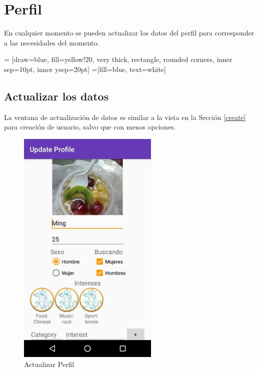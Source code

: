 \documentclass[10pt,letterpaper,extrafontsizes]{memoir}
\begin{document}
\chapter{Perfil}\label{cap:perf}

En cualquier momento se pueden actualizar los datos del perfil para corresponder a las necesidades del momento.

\begin{center}
 = [draw=blue, fill=yellow!20, very thick,
    rectangle, rounded corners, inner sep=10pt, inner ysep=20pt]
 =[fill=blue, text=white]
\end{center}
%

\newpage
\section{Actualizar los datos}

La ventana de actualización de datos es similar a la vista en la Sección \ref{create} para creación de usuario, salvo que con menos opciones.

\begin{figure}[H]
    \centering
\includegraphics[width=0.6\textwidth]{graficos/capturas/n}
    \caption{Actualizar Perfil}
    \label{fig:actperf}
\end{figure}
\end{document}
